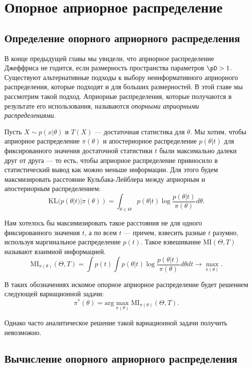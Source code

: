 \section{Опорное априорное распределение}
\label{sec:reference_prior}

\subsection{Определение опорного априорного распределения}

В конце предыдущей главы мы увидели, что априорное распределение Джеффриса не годится, если размерность пространства параметров $\pD > 1$.
Существуют альтернативные подходы к выбору неинформативного априорного распределения, которые подходят и для больших размерностей.
В этой главе мы рассмотрим такой подход. 
Априорные распределения, которые получаются в результате его использования, называются
\emph{опорными априорными распределениями}.

Пусть $X \sim p(x | \theta)$ и $T(X)$ --- достаточная статистика для $\theta$.
Мы хотим, чтобы априорное распределение $\pi(\theta)$ и апостериорное распределение $p(\theta | t)$ для фиксированного значения достаточной статистики $t$ были максимально далеки друг от друга --- то есть,
чтобы априорное распределение привносило в статистический вывод как можно меньше информации.
Для этого будем максмизировать расстояние Кульбака-Лейблера между априорным и апостериорным распределением:
\[
\mathrm{KL}(p(\theta | t) | \pi(\theta)) = \int_{\theta \in \Theta} p(\theta | t) \log \frac{p(\theta | t)}{\pi(\theta)} d\theta.
\]

Нам хотелось бы максимизировать такое расстояния не для одного фиксированного значения $t$, а по всем $t$ --- причем, взвесить разные $t$ разумно,
используя маргинальное распределение $p(t)$.
Такое взвешивание $\mathrm{MI}(\Theta, T)$ называют взаимной информацией.
\[
\mathrm{MI}_{\pi(\theta)}(\Theta, T) = \int p(t) \int p(\theta | t) \log \frac{p(\theta | t)}{\pi(\theta)} d\theta dt \rightarrow \max_{\pi(\theta)}.
\]

В таких обозначениях искомое опорное априорное распределение будет решением следующей вариационной задачи:
\[
\pi^*(\theta) = \mathrm{arg} \max_{\pi(\theta)} \mathrm{MI}_{\pi(\theta)}(\Theta, T).
\]

Однако часто аналитическое решение такой вариационной задачи получить невозможно.

\subsection{Вычисление опорного априорного распределения}

